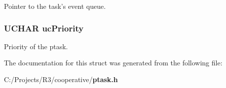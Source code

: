 Pointer to the task's event queue. 
\subsubsection[{ucPriority}]{\setlength{\rightskip}{0pt plus 5cm}UCHAR {\bf ucPriority}}\label{struct_p_t_a_s_k___s_t_r_u_c_t_a5b5e11c9fa0d320daa073630624064fe}


Priority of the ptask. 

The documentation for this struct was generated from the following file:\begin{DoxyCompactItemize}
\item 
C:/Projects/R3/cooperative/{\bf ptask.h}\end{DoxyCompactItemize}
